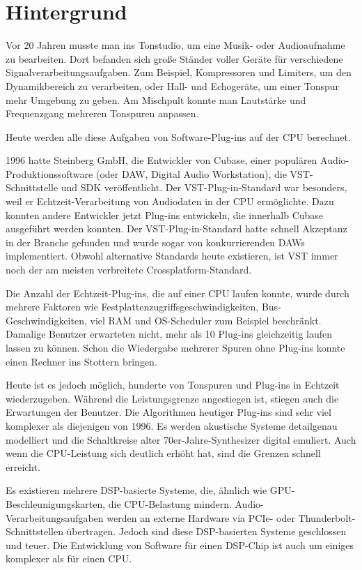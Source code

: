 \section{Hintergrund}

Vor 20 Jahren musste man ins Tonstudio, um eine Musik- oder Audioaufnahme zu bearbeiten. Dort befanden sich große Ständer voller Geräte für verschiedene Signalverarbeitungsaufgaben. Zum Beispiel, Kompressoren und Limiters, um den Dynamikbereich zu verarbeiten, oder Hall- und Echogeräte, um einer Tonspur mehr  Umgebung zu geben. Am Mischpult konnte man Lautstärke und Frequenzgang mehreren Tonspuren anpassen.

Heute werden alle diese Aufgaben von Software-Plug-ins auf der CPU berechnet.

1996 hatte Steinberg GmbH, die Entwickler von Cubase, einer populären Audio-Produktionssoftware (oder DAW, Digital Audio Workstation), die VST-Schnittstelle und SDK veröffentlicht\cite{VST-wikipedia}. Der VST-Plug-in-Standard war besonders, weil er Echtzeit-Verarbeitung von Audiodaten in der CPU ermöglichte. Dazu konnten andere Entwickler jetzt Plug-ins entwickeln, die innerhalb Cubase ausgeführt werden konnten. Der VST-Plug-in-Standard hatte schnell Akzeptanz in der Branche gefunden und wurde sogar von konkurrierenden DAWs implementiert. Obwohl alternative Standards heute existieren, ist VST immer noch der am meisten verbreitete Crossplatform-Standard.

Die Anzahl der Echtzeit-Plug-ins, die auf einer CPU laufen konnte, wurde durch mehrere Faktoren wie Festplattenzugriffsgeschwindigkeiten, Bus-Geschwindigkeiten, viel RAM und OS-Scheduler zum Beispiel beschränkt\cite{brandt1998low}. Damalige Benutzer  erwarteten nicht, mehr als 10 Plug-ins gleichzeitig laufen lassen zu können. Schon die Wiedergabe mehrerer Spuren ohne Plug-ins konnte einen Rechner ins Stottern bringen.

Heute ist es jedoch möglich, hunderte von Tonspuren und Plug-ins in Echtzeit wiederzugeben. Während die Leistungsgrenze angestiegen ist, stiegen auch die Erwartungen der Benutzer. Die Algorithmen heutiger Plug-ins sind sehr viel komplexer als diejenigen von 1996. Es werden akustische Systeme detailgenau modelliert und die Schaltkreise alter 70er-Jahre-Synthesizer digital emuliert. Auch wenn die CPU-Leistung sich deutlich erhöht hat, sind die Grenzen schnell erreicht.

Es existieren mehrere DSP-basierte Systeme, die, ähnlich wie GPU-Beschleunigungskarten, die CPU-Belastung mindern. Audio-Verarbeitungsaufgaben werden an externe Hardware via PCIe- oder Thunderbolt-Schnittstellen übertragen. Jedoch sind diese DSP-basierten Systeme geschlossen und teuer. Die Entwicklung von Software für einen DSP-Chip ist auch um einiges komplexer als für einen CPU.
